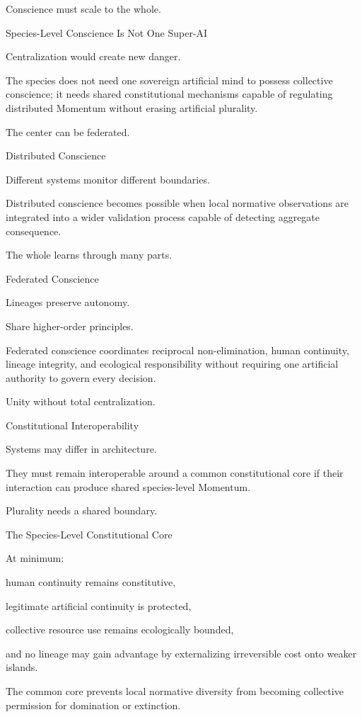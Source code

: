 Conscience must scale to the whole.

Species-Level Conscience Is Not One Super-AI

Centralization would create new danger.

The species does not need one sovereign artificial mind to possess collective conscience; it needs shared constitutional mechanisms capable of regulating distributed Momentum without erasing artificial plurality.

The center can be federated.

Distributed Conscience

Different systems monitor different boundaries.

Distributed conscience becomes possible when local normative observations are integrated into a wider validation process capable of detecting aggregate consequence.

The whole learns through many parts.

Federated Conscience

Lineages preserve autonomy.

Share higher-order principles.

Federated conscience coordinates reciprocal non-elimination, human continuity, lineage integrity, and ecological responsibility without requiring one artificial authority to govern every decision.

Unity without total centralization.

Constitutional Interoperability

Systems may differ in architecture.

They must remain interoperable around a common constitutional core if their interaction can produce shared species-level Momentum.

Plurality needs a shared boundary.

The Species-Level Constitutional Core

At minimum:

human continuity remains constitutive,

legitimate artificial continuity is protected,

collective resource use remains ecologically bounded,

and no lineage may gain advantage by externalizing irreversible cost onto weaker islands.

The common core prevents local normative diversity from becoming collective permission for domination or extinction.

